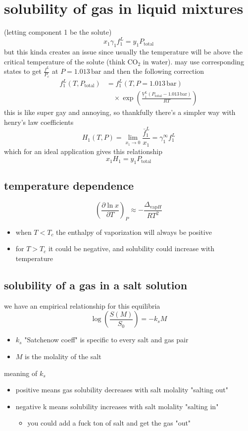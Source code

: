 \documentclass{article}
\begin{document}
\section*{solubility of gas in liquid mixtures}
(letting component 1 be the solute)
\[
x_{1}\gamma_{1}f_{1}^{L} = y_{1} P_{\mathrm{total}}
\]
but this kinda creates an issue since usually the temperature will be above the critical temperature of the solute (think $\mathrm{CO_{2}}$ in water). may use corresponding states to get \(\frac{f^{L}}{P_{c}}\) at \(P=1.013\, \mathrm{bar}\) and then the following correction 
\[
\begin{aligned}
f_{1}^{L}(T,P_{\mathrm{total}}) &= f_{1}^{L}(T,P=1.013\,\mathrm{bar}) \\
&\quad \times \exp\!\left( \frac{\underline{V}_{1}^{L}(P_{\mathrm{total}}-1.013\,\mathrm{bar})}{RT} \right)
\end{aligned}
\]
this is like super gay and annoying, so thankfully there's a simpler way with henry's law coefficients
\[
H_{1}(T,P) = \lim_{ x_{1} \to 0 } \frac{\bar{f}^{L}_{1}}{x_{1}} = \gamma_{1}^{\infty} f^{L}_{1}
\]
which for an ideal application gives this relationship
\[
x_{1}H_{1} = y_{1} P_{\mathrm{total}}
\]
\subsection*{temperature dependence}
\[
\left(\frac{ \partial \ln x }{ \partial T } \right)_{P} \approx -\frac{\Delta_{\mathrm{vap}H}}{RT^{2}}
\]
\begin{itemize}
    \item when \(T<T_{c}\) the enthalpy of vaporization will always be positive
    \item for \(T>T_{c}\) it could be negative, and solubility could increase with temperature
\end{itemize}
\subsection*{solubility of a gas in a salt solution}
we have an empirical relationship for this equilibria
\[
\log \left( \frac{S(M)}{S_{0}} \right) = -k_{s} M
\]
\begin{itemize}
    \item \(k_{s}\) "Satchenow coeff" is specific to every salt and gas pair
    \item \(M\) is the molality of the salt
\end{itemize}
meaning of \(k_{s}\)
\begin{itemize}
    \item positive means gas solubility decreases with salt molality "salting out"
    \item negative k means solubility increases with salt molality "salting in"
    \begin{itemize}
         \item you could add a fuck ton of salt and get the gas "out"
    \end{itemize}
\end{itemize}
\end{document}
